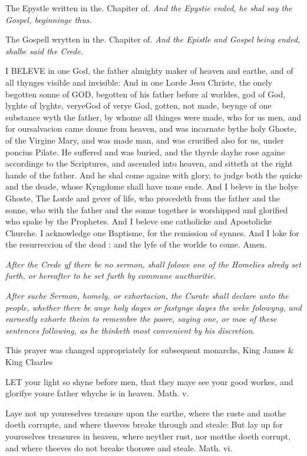 The Epystle written in the. Chapiter of.
\emph{And
the Epystie ended, he shal say the Gospel, beginninge thus.}

The Gospell wrytten in the. Chapiter of.
\emph{And
the Epistle and Gospel being ended, shalbe said the Crede.}

I
BELEVE in one God, the father almighty maker of heaven and earthe, and
of all thynges visible and invisible: And in one Lorde Jesu Christe, the
onely begotten sonne of GOD, begotten of his father before al worldes,
god of God, lyghte of lyghte, verye\textbf{}God of verye God, gotten, not
made, beynge of one substance wyth the father, by whome all thinges were
made, who for us men, and for our\textbf{}salvacion came doune from heaven,
and was incarnate by\emph{}the holy Ghoste, of the Virgine Mary, and
was made man, and was crucified also for us, under poncius Pilate. He
suffered and was buried, and the thyrde day\textbf{}he rose againe accordinge
to the Scriptures, and ascended into heaven, and sitteth at the right
hande of the father. And he shal come againe with glory, to judge both
the quicke and the deade, whose Kyngdome shall have none ende. And I beleve
in the holye Ghoste, The Lorde and gever of life, who procedeth from the
father and the sonne, who with the father and the sonne together is worshipped
and glorified who spake by the Prophetes. And I beleve one catholicke
and Apostolicke Churche. I acknowledge one Baptisme, for the remission
of synnes. And I loke for the resurreccion of the dead : and the lyfe
of the worlde to come. Amen.

\emph{After
the Crede yf there be no sermon, shall folowe one of the Homelies alredy
set furth, or hereafter to he set furth by commune aucthoritie.}

\emph{After
suche Sermon, homely, or exhortacion, the Curate shall declare unto the
people, whether there be anye holy dayes or fastynge dayes the weke folowyng,
and earnestly exhorte theim to remembre the poore, saying one, or moe
of these sentences following, as he thinketh most convenient by his discretion.}

This
prayer was changed appropriately for subsequent monarchs, King James \&
King Charles

LET
your light so shyne before men, that they maye see your good workes, and
glorifye youre father whyche is in heaven. Math.
v.

Laye not up youreselves treasure upon the earthe, where the ruste and
mothe doeth corrupte, and where theeves breake through and steale: But
lay up for youreselves treasures in heaven, where neyther rust, nor motthe
doeth corrupt, and where theeves do not breake thorowe and steale. Math.
vi.

